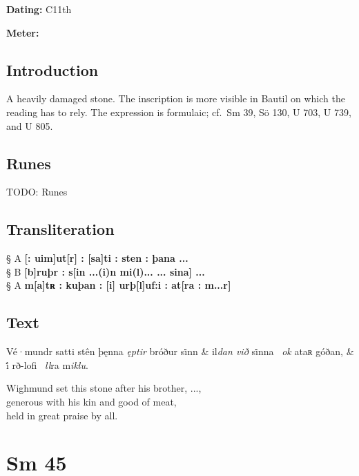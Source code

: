 \begin{flushright}%
\textbf{Dating:} C11th

\textbf{Meter:} \Fornyrdislag
\end{flushright}%

\subsection{Introduction}

A heavily damaged stone.  The inscription is more visible in Bautil on which the reading has to rely.
The expression is formulaic; cf.~Sm 39, Sö 130, U 703, U 739, and U 805.

\subsection{Runes}

TODO: Runes%

\subsection{Transliteration}

§ A \textbf{[: uim]ut[r] : [sa]ti : sten : þana ...} \\
§ B \textbf{[b]ruþr : s[in ...(i)n mi(l)... ... sina] ...} \\
§ A \textbf{m[a]tʀ : kuþan : [i] urþ[l]uf:i : at[ra : m...r]}

\subsection{Text}

\bvg\bva[]%
Vé·mundr satti stên þęnna \emph{ęptir} bróður si̇nn  &
il\emph{dan við} si̇nna \hld\ \emph{ok} ataʀ góðan, &
i̇́ rð-lofi \hld\ \emph{ll}ra m\emph{iklu}.\eva

\bvb Wighmund set this stone after his brother, ..., \\
generous with his kin and good of meat, \\
held in great praise by all.\evb\evg

\sectionline\clearpage


\section{Sm 45}

